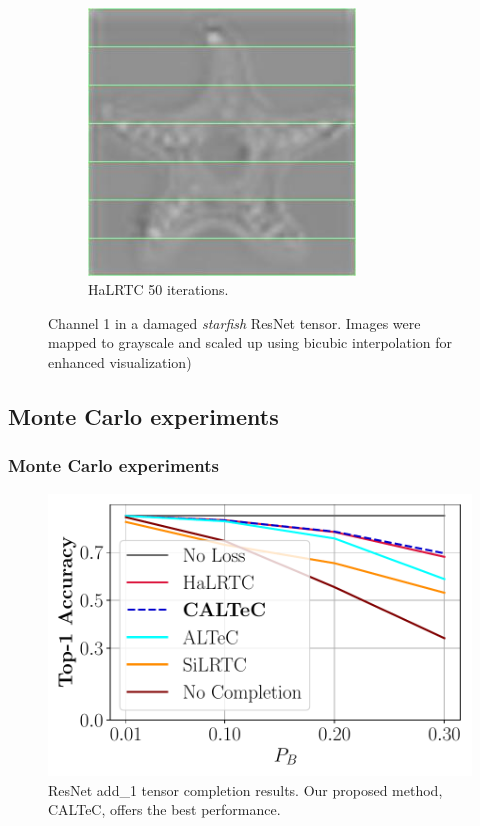 \documentclass[aspectratio=169]{beamer}
\begin{document}
\begin{frame}
\begin{figure}[H]
\begin{subfigure}{.17\textwidth}
			\includegraphics[width=0.778\textwidth]{halrtc50repairedchannel1scaled.jpg}
			\caption{HaLRTC 50 iterations.}
		\end{subfigure}
		\caption{Channel 1 in a damaged \textit{starfish} ResNet tensor. Images were mapped to grayscale and scaled up using bicubic interpolation for enhanced visualization)}
		\label{fig:expt:repair:demo}
	\end{figure}
\end{frame}

\subsection{Monte Carlo experiments}
\begin{frame}
\frametitle{Monte Carlo experiments}
\begin{figure}[H]
    \centering
    \includegraphics[scale=0.49]{add1fontsize20v2modified.pdf}
    \caption{ResNet add\_1 tensor completion results. Our proposed method, CALTeC, offers the best performance.}
    \label{fig:mcresnet18add1}
\end{figure}
\end{frame}
\end{document}
